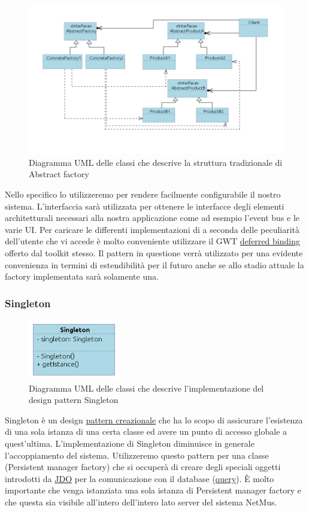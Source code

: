 \begin{figure}[h]
\centering
\includegraphics[width=16.5cm]{img/ST/AbstractFactory.png}
\caption{Diagramma UML delle classi che descrive la struttura tradizionale di
Abstract factory}
\end{figure}
Nello specifico lo utilizzeremo per rendere facilmente configurabile il nostro
sistema. L'interfaccia  sar\`a utilizzata per ottenere le
interfacce degli elementi architetturali necessari alla nostra applicazione come
ad esempio l'event bus e le varie UI.
Per caricare le differenti implementazioni di  a seconda delle
peculiarit\`a dell'utente che vi accede \`e molto conveniente utilizzare il GWT
\underline{deferred binding} offerto dal toolkit stesso.
Il pattern in questione verr\`a utilizzato per una evidente convenienza in termini
di estendibilit\`a per il futuro anche se allo stadio attuale la factory
implementata sar\`a solamente una.

\newpage
\subsubsection{Singleton}
\begin{figure}[h]
\centering
\includegraphics[width=4cm]{img/ST/Singleton.png}
\caption{Diagramma UML delle classi che descrive l'implementazione del design
pattern Singleton}
\end{figure}
Singleton \`e un design \underline{pattern creazionale} che ha lo scopo di
assicurare l'esistenza di una sola istanza di una certa classe ed avere un punto di accesso
globale a quest'ultima. 
L'implementazione di Singleton diminuisce in generale l'accoppiamento del
sistema.
Utilizzeremo questo pattern per una classe (Persistent manager factory) che si
occuper\`a di creare degli speciali oggetti introdotti da \underline{JDO} per la
comunicazione con il database (\underline{query}). \`E molto importante che
venga istanziata una sola istanza di Persistent manager factory e che questa sia visibile all'intero
dell'intero lato server del sistema NetMus. 

